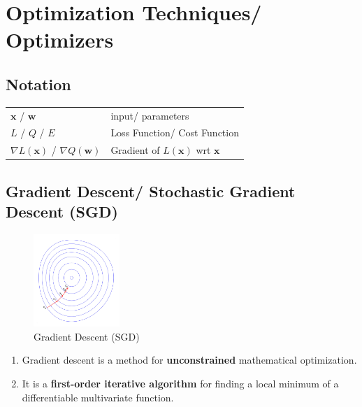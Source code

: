 \chapter{Optimization Techniques/ Optimizers}

\section*{Notation}

\begin{table}[h]
    \begin{tabular}{l l}
        $\mathbf{x}$ / $\mathbf{w}$ & input/ parameters \\
        
        $L$ / $Q$ / $E$ & Loss Function/ Cost Function \\

        $\nabla L(\mathbf{x})$ / $\nabla Q(\mathbf{w})$ & Gradient of $L(\mathbf{x})$ wrt $\mathbf{x}$ \\
    \end{tabular}
\end{table}


\section{Gradient Descent/ Stochastic Gradient Descent (SGD) \cite{wiki-Gradient_descent,wiki-Stochastic_gradient_descent}}\label{Gradient Descent (GD)}\label{Stochastic Gradient Descent (SGD)}

\begin{table}[h]
    \begin{minipage}[t]{0.5\linewidth}
        \begin{figure}[H]
            \centering
            \includegraphics[width=\linewidth, height=3.5cm, keepaspectratio]{Pictures/optimizers/Gradient_descent.jpg}
            \caption{Gradient Descent (SGD)}
        \end{figure}
    \end{minipage}
    \hfill
    \begin{minipage}[t]{0.5\linewidth}
        \begin{enumerate}
            \item Gradient descent is a method for \textbf{unconstrained} mathematical optimization. 
            
            \item It is a \textbf{first-order iterative algorithm} for finding a local minimum of a differentiable multivariate function.
        \end{enumerate}        
    \end{minipage}
\end{table}

